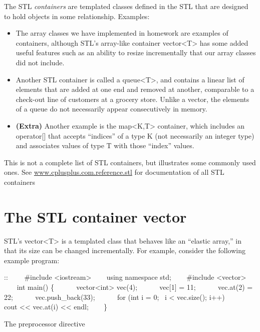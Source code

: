 \documentclass[letterpaper,10pt,openany,oneside]{sphinxmanual}
\begin{document}
The STL \emph{containers} are templated classes defined in the STL
that are designed to hold objects in some relationship. Examples:
\begin{itemize}
\item {} 
The array classes we have implemented in homework are examples of containers, although STL's array-like container vector\textless{}T\textgreater{} has some added useful features such as an ability to resize incrementally that our array classes did not include.

\item {} 
Another STL container is called a queue\textless{}T\textgreater{}, and contains a linear list of elements that are added at one end and removed at another, comparable to a check-out line of customers at a grocery store. Unlike a vector, the elements of a queue do not necessarily appear consecutively in memory.

\item {} 
\textbf{(Extra)} Another example is the map\textless{}K,T\textgreater{} container, which includes an operator{[}{]} that accepts ``indices'' of a type K (not necessarily an integer type) and associates values of type T with those ``index'' values.

\end{itemize}

This is not a complete list of STL containers, but illustrates
some commonly used ones. See
\href{http://www.cplusplus.com/reference/stl/}{www.cplusplus.com.reference.stl}
for documentation of all STL containers


\section{The STL container vector}
\label{IntroSTLContainers/introduction_stl_containers:the-stl-container-vector}
STL's vector\textless{}T\textgreater{} is a templated class that behaves like an
``elastic array,'' in that its size can be changed incrementally. For
example, consider the following example program:

::
    \#include \textless{}iostream\textgreater{}
    using namespace std;
    \#include \textless{}vector\textgreater{}
    int main() \{
      vector\textless{}int\textgreater{} vec(4);
      vec{[}1{]} = 11;
      vec.at(2) = 22;
      vec.push\_back(33);
      for (int i = 0;  i \textless{} vec.size(); i++)
        cout \textless{}\textless{} vec.at(i) \textless{}\textless{} endl;
    \}

The preprocessor directive
\end{document}
